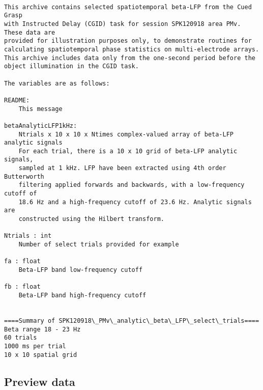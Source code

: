 \documentclass[11pt]{article}
\begin{document}
    \begin{Verbatim}[commandchars=\\\{\}]

This archive contains selected spatiotemporal beta-LFP from the Cued Grasp 
with Instructed Delay (CGID) task for session SPK120918 area PMv. These data are
provided for illustration purposes only, to demonstrate routines for 
calculating spatiotemporal phase statistics on multi-electrode arrays.
This archive includes data only from the one-second period before the 
object illumination in the CGID task.

The variables are as follows:

README:
    This message

betaAnalyticLFP1kHz:
    Ntrials x 10 x 10 x Ntimes complex-valued array of beta-LFP analytic signals
    For each trial, there is a 10 x 10 grid of beta-LFP analytic signals, 
    sampled at 1 kHz. LFP have been extracted using 4th order Butterworth 
    filtering applied forwards and backwards, with a low-frequency cutoff of 
    18.6 Hz and a high-frequency cutoff of 23.6 Hz. Analytic signals are 
    constructed using the Hilbert transform.

Ntrials : int
    Number of select trials provided for example

fa : float
    Beta-LFP band low-frequency cutoff

fb : float
    Beta-LFP band high-frequency cutoff


====Summary of SPK120918\_PMv\_analytic\_beta\_LFP\_select\_trials====
Beta range 18 - 23 Hz
60 trials
1000 ms per trial
10 x 10 spatial grid

    \end{Verbatim}

    \subsection{Preview data}\label{preview-data}
\end{document}
